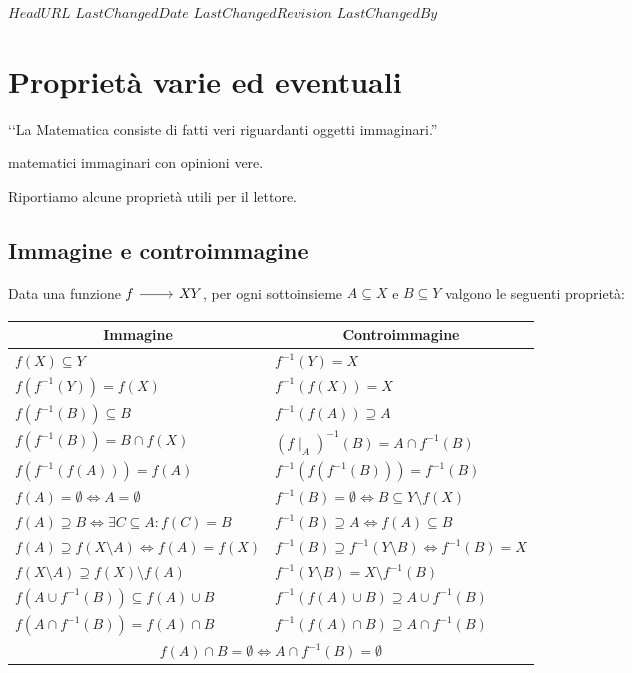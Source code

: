 \svnidlong
{$HeadURL$}
{$LastChangedDate$}
{$LastChangedRevision$}
{$LastChangedBy$}

\chapter{Proprietà varie ed eventuali}

\begin{introduction}
‘‘La Matematica consiste di fatti veri riguardanti oggetti immaginari.''
\begin{flushright}
	 matematici immaginari con opinioni vere.
\end{flushright}
\end{introduction}

Riportiamo alcune proprietà utili per il lettore.
\section{Immagine e controimmagine}
Data una funzione $\funz{f}{X}{Y}$, per ogni sottoinsieme $A\subseteq X$ e $B\subseteq Y$ valgono le seguenti proprietà:
\begin{center}
	\begin{tabular}{l|l}
	\multicolumn{1}{c|}{\textbf{Immagine}} 	& \multicolumn{1}{c}{\textbf{Controimmagine}}\\ \hline
	$f(X)\subseteq Y$				& $f^{-1}(Y) = X$ 	\\ 
	$f(f^{-1}(Y)) = f(X)$			& $f^{-1}(f(X))= X$ \\
	$f(f^{-1}(B)) \subseteq B$ \footnotemark{}	& $f^{-1}(f(A)) \supseteq A$ \footnotemark{}	\\
	$f(f^{-1}(B)) = B \cap f(X)$	& $(f \mid_A)^{-1}(B) = A \cap f^{-1}(B)$											\\
	$f(f^{-1}(f(A))) = f(A)$		& $f^{-1}(f(f^{-1}(B))) = f^{-1}(B)$											\\
	$f(A) = \emptyset \iff A = \emptyset$	&  $f^{-1}(B) = \emptyset \iff B \subseteq Y \setminus f(X)$					\\
	$f(A) \supseteq B \iff \exists C \subseteq A \colon f(C) = B$ & $f^{-1}(B) \supseteq A \iff f(A) \subseteq B$\\
	$f(A) \supseteq f(X \setminus A) \iff f(A) = f(X)$ & $f^{-1}(B) \supseteq f^{-1}(Y \setminus B) \iff f^{-1}(B) = X$\\
	$f(X \setminus A) \supseteq f(X) \setminus f(A)$ & $f^{-1}(Y \setminus B) = X \setminus f^{-1}(B)$ \\
	$f(A \cup f^{-1}(B)) \subseteq f(A) \cup B$ & $f^{-1}(f(A) \cup B) \supseteq A \cup f^{-1}(B)$ \\
	$f(A \cap f^{-1}(B)) = f(A) \cap B$ & $f^{-1}(f(A) \cap B) \supseteq A \cap f^{-1}(B)$ \\
	\multicolumn{2}{c}{$f(A) \cap B = \emptyset \iff A \cap f^{-1}(B) = \emptyset$}
\end{tabular}
\addtocounter{footnote}{-2}
\end{center}

